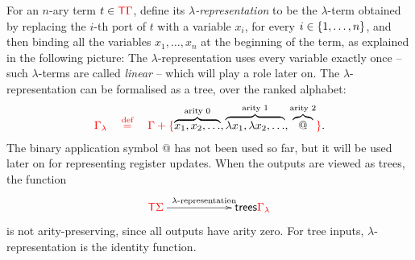 For an $n$-ary term $ t \in {\color{red}{\mathsf T}} {\color{red}{\Gamma}}$, define its \emph{$\lambda$-representation} to be the $\lambda$-term obtained by  replacing the  $i$-th port  of $t$ with a variable $x_i$, for every $i \in \{1,\ldots,n\}$, and then  binding all the  variables $x_1,\ldots,x_n$  at the beginning of the term, as explained in the following picture:
The $\lambda$-representation uses every variable exactly once -- such $\lambda$-terms are called \emph{linear} -- which will play a role later on.
The  $\lambda$-representation can be formalised as a tree, over the ranked alphabet:
\begin{align*}
{\color{red}{ \Gamma_\lambda \quad \stackrel{\text{def}}=\quad \Gamma + \{{\color{black}{\overbrace{x_1,x_2,\ldots}^\text{arity 0},\overbrace{\lambda x_1,\lambda x_2,\ldots}^\text{arity 1}, \overbrace{@}^{\text{arity 2}}}}\}}}.
\end{align*}
The binary application symbol @ has  not been used so far, but it will be used later on for representing register updates.
When the outputs are viewed as trees, the function
\begin{align}\label{eq:lambda-representation-term}
\xymatrix@C=2cm{
    \tmonad \rSigma 
    \ar[r]^{\text{$\lambda$-representation}} &
    \trees {\ranked{\Gamma_\lambda}}
}
\end{align}
is not arity-preserving, since all outputs have arity zero. For tree inputs, $\lambda$-representation is the identity function. 

